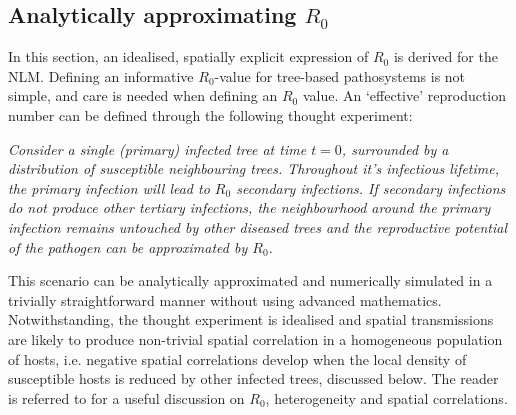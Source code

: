 \subsection{Analytically approximating $R_0$}

In this section, an idealised, spatially explicit expression of $R_0$ is derived for the NLM.
Defining an informative $R_0$-value for tree-based pathosystems is not simple, and care is needed when defining an $R_0$ value. 
An `effective' reproduction number can be defined through the following thought experiment: 

\textit{Consider a single (primary) infected tree at time $t=0$, surrounded by a distribution of susceptible neighbouring trees. Throughout it's infectious lifetime, the primary infection will lead to $R_0$ secondary infections. If secondary infections do not produce other tertiary infections, the neighbourhood around the primary infection remains untouched by other diseased trees and the reproductive potential of the pathogen can be approximated by $R_0$. }

This scenario can be analytically approximated and numerically simulated in a trivially straightforward manner without using advanced mathematics.
Notwithstanding, the thought experiment is idealised and spatial transmissions are likely to produce non-trivial spatial correlation in a homogeneous population of hosts\textemdash, i.e. negative spatial correlations develop when the local density of susceptible hosts is reduced by other infected trees, discussed below.
The reader is referred to \cite{R0-perc-ref} for a useful discussion on $R_0$, heterogeneity and spatial correlations.

